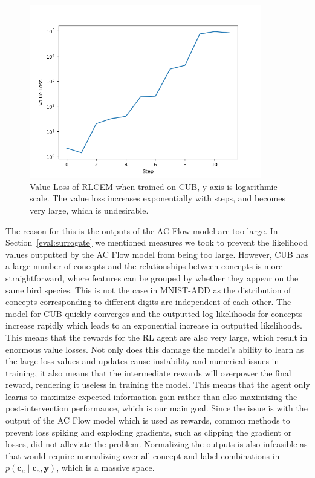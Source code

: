 \begin{figure}[!h]
    \centering
    \includegraphics[width=0.9\textwidth]{figs/evaluation/cub_v_loss_spike.png}
    \caption{
        Value Loss of RLCEM when trained on CUB,
        y-axis is logarithmic scale.
        The value loss increases exponentially with steps, 
        and becomes very large, which is undesirable.
    }
    \label{fig:cub-v-loss-spike}
\end{figure}

The reason for this is the outputs of the AC Flow model
are too large.
In Section~\ref{eval:surrogate} we mentioned measures we took to prevent
the likelihood values outputted by the AC Flow model from being too large.
However, CUB has a large number of concepts and 
the relationships between concepts is more straightforward,
where features can be grouped by
whether they appear on the same bird species.
This is not the case in MNIST-ADD as the distribution of concepts corresponding to 
different 
digits are independent of each other.
The model for CUB quickly converges and the outputted log likelihoods 
for concepts increase rapidly which leads to an exponential increase 
in outputted likelihoods. This means that the rewards for the RL agent
are also very large, which result in enormous value losses.
Not only does this damage the model's ability to learn
as the large loss values and updates cause instability and numerical
issues in training,
it also means that the intermediate rewards will overpower the final reward,
rendering it useless in training the model.
This means that the agent only learns to 
maximize expected information gain rather than
also maximizing the post-intervention performance,
which is our main goal.
Since the issue is with the output of the AC Flow model
which is used as rewards, common methods to prevent loss spiking
and exploding gradients,
such as clipping the gradient or losses, did not alleviate the problem.
Normalizing the outputs is also infeasible as that would require
normalizing over all concept and label combinations in 
$p(\mathbf{c}_u \mid \mathbf{c}_o, \mathbf{y})$,
which is a massive space.


